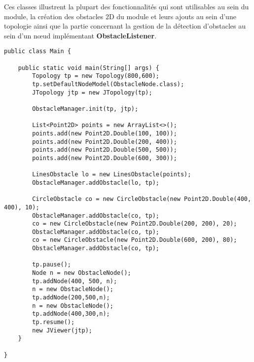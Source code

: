 \documentclass{article}
\begin{document}
Ces classes illustrent la plupart des fonctionnalités qui sont utilisables au sein du module, la création des obstacles 2D du module et leurs ajouts au sein d'une topologie ainsi que la partie concernant la gestion de la détection d'obstacles au sein d'un nœud implémentant \textbf{ObstacleListener}.\medskip

\begin{lstlisting}[frame=shadowbox,captionpos=b,caption={Classe Main},abovecaptionskip=2ex,label={main}]
public class Main {

    public static void main(String[] args) {
        Topology tp = new Topology(800,600);
        tp.setDefaultNodeModel(ObstacleNode.class);
        JTopology jtp = new JTopology(tp);

        ObstacleManager.init(tp, jtp);

        List<Point2D> points = new ArrayList<>();
        points.add(new Point2D.Double(100, 100));
        points.add(new Point2D.Double(200, 400));
        points.add(new Point2D.Double(500, 500));
        points.add(new Point2D.Double(600, 300));

        LinesObstacle lo = new LinesObstacle(points);
        ObstacleManager.addObstacle(lo, tp);

        CircleObstacle co = new CircleObstacle(new Point2D.Double(400, 400), 10);
        ObstacleManager.addObstacle(co, tp);
        co = new CircleObstacle(new Point2D.Double(200, 200), 20);
        ObstacleManager.addObstacle(co, tp);
        co = new CircleObstacle(new Point2D.Double(600, 200), 80);
        ObstacleManager.addObstacle(co, tp);

        tp.pause();
        Node n = new ObstacleNode();
        tp.addNode(400, 500, n);
        n = new ObstacleNode();
        tp.addNode(200,500,n);
        n = new ObstacleNode();
        tp.addNode(400,300,n);
        tp.resume();
        new JViewer(jtp);
    }

}
\end{lstlisting}
\end{document}
